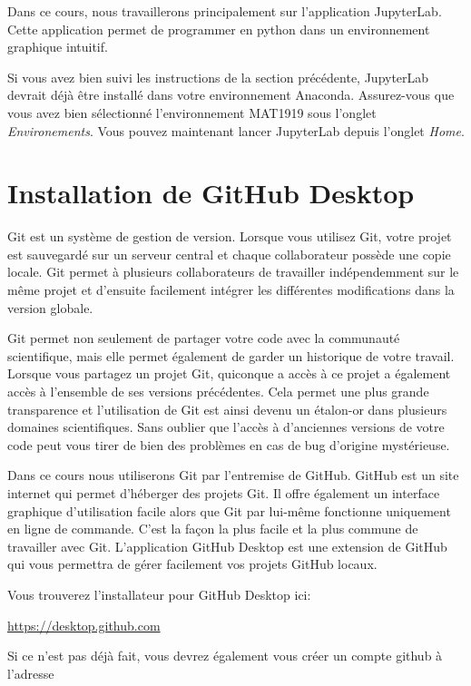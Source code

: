 \documentclass{article}
\begin{document}
Dans ce cours, nous travaillerons principalement sur l'application JupyterLab. Cette application permet de programmer en python dans un environnement graphique intuitif.

Si vous avez bien suivi les instructions de la section précédente, JupyterLab devrait déjà être installé dans votre environnement Anaconda. Assurez-vous que vous avez bien sélectionné l'environnement MAT1919 sous l'onglet \emph{Environements}. Vous pouvez maintenant lancer JupyterLab depuis l'onglet \emph{Home}.

\section{Installation de GitHub Desktop}

Git est un système de gestion de version. Lorsque vous utilisez Git, votre projet est sauvegardé sur un serveur central et chaque collaborateur possède une copie locale. Git permet à plusieurs collaborateurs de travailler indépendemment sur le même projet et d'ensuite facilement intégrer les différentes modifications dans la version globale.

Git permet non seulement de partager votre code avec la communauté scientifique, mais elle permet également de garder un historique de votre travail. Lorsque vous partagez un projet Git, quiconque a accès à ce projet a également accès à l'ensemble de ses versions précédentes. Cela permet une plus grande transparence et l'utilisation de Git est ainsi devenu un étalon-or dans plusieurs domaines scientifiques. Sans oublier que l'accès à d'anciennes versions de votre code peut vous tirer de bien des problèmes en cas de bug d'origine mystérieuse.

Dans ce cours nous utiliserons Git par l'entremise de GitHub. GitHub est un site internet qui permet d'héberger des projets Git. Il offre également un interface graphique d'utilisation facile alors que Git par lui-même fonctionne uniquement en ligne de commande. C'est la façon la plus facile et la plus commune de travailler avec Git. L'application GitHub Desktop est une extension de GitHub qui vous permettra de gérer facilement vos projets GitHub locaux.

Vous trouverez l'installateur pour GitHub Desktop ici:

\noindent \href{https://desktop.github.com}{https://desktop.github.com}

Si ce n'est pas déjà fait, vous devrez également vous créer un compte github à l'adresse
\end{document}
